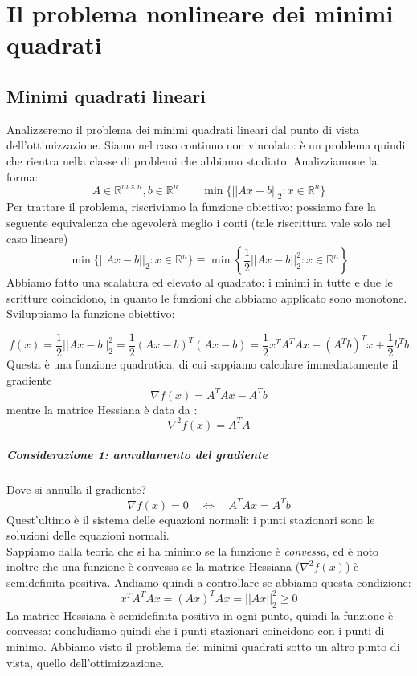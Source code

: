 


\inbpdocument 

\chapter{Il problema nonlineare dei minimi quadrati}
\section{Minimi quadrati lineari}
Analizzeremo il problema dei minimi quadrati lineari dal punto di vista
dell'ottimizzazione. Siamo nel caso continuo non vincolato:
è un problema quindi che rientra nella classe di problemi
che abbiamo studiato. Analizziamone la forma:
$$ A \in \mathbb{R}^{m \times n}, b \in \mathbb{R}^{n} \qquad
 \min \{ || Ax -b ||_{2} : x \in \mathbb{R}^{n} \} $$
Per trattare il problema, riscriviamo la funzione obiettivo:
possiamo fare la seguente equivalenza che  agevoler\`a
meglio i conti (tale riscrittura vale solo nel caso lineare)
$$ \min \{ || Ax -b ||_{2} : x \in \mathbb{R}^{n} \} 
 \equiv
 \min \left\{ \frac{1}{2} || Ax -b ||_{2}^{2} : x \in \mathbb{R}^{n} \right\}
 $$
Abbiamo fatto una scalatura ed elevato al quadrato:
i minimi in tutte e due le scritture coincidono, in quanto
le funzioni che abbiamo applicato sono monotone.
Sviluppiamo la funzione obiettivo:

$$ f(x) = \frac{1}{2} || Ax - b ||_{2}^{2} = \frac{1}{2}(Ax-b)^{T}(Ax-b) =
\frac{1}{2}x^{T} A^{T}A x - (A^{T}b)^{T}x + \frac{1}{2} b^{T}b $$
Questa \`e una  funzione quadratica, di cui sappiamo calcolare immediatamente
il gradiente 
$$ \nabla f(x) = A^{T}A x - A^{T}b $$
mentre la matrice Hessiana \`e data da :
$$ \nabla^{2}f(x) = A^{T}A$$

\paragraph{Considerazione 1: annullamento del gradiente}
Dove si annulla il gradiente?
$$ \nabla f(x) = 0 \quad
 \Longleftrightarrow \quad 
A^{T}A x = A^{T}b $$
Quest'ultimo è il sistema delle equazioni normali: i punti stazionari
sono le soluzioni delle equazioni normali. \\
Sappiamo dalla teoria che si ha minimo se la funzione è \emph{convessa},
ed \`e noto inoltre che una funzione \`e convessa se la matrice Hessiana
($\nabla^{2}f(x)$) \`e semidefinita positiva.
Andiamo quindi a controllare se abbiamo questa condizione:
$$ x^{T} A^{T}A x = (Ax)^{T}Ax = || Ax||_{2}^{2} \geq 0$$
La matrice Hessiana \`e semidefinita positiva in ogni punto, quindi
la funzione è convessa: concludiamo quindi che i punti stazionari
coincidono con i punti di minimo. Abbiamo visto il problema dei minimi quadrati sotto un altro punto di vista, quello dell'ottimizzazione.


